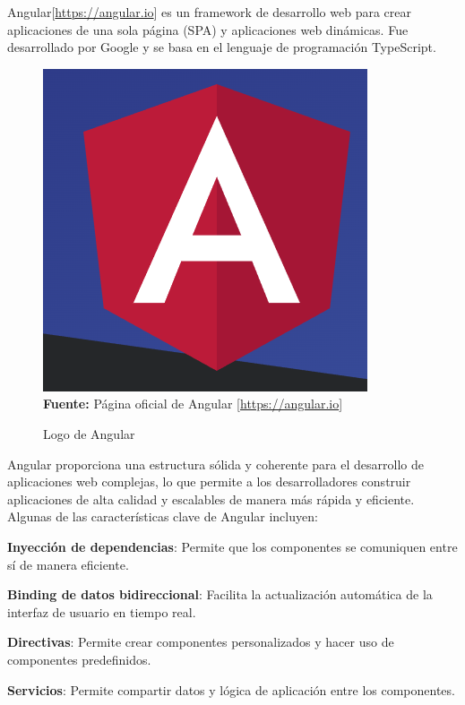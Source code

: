 Angular[\url{https://angular.io}] es un framework de desarrollo web para crear
aplicaciones de una sola página (SPA) y aplicaciones web dinámicas. Fue
desarrollado por Google y se basa en el lenguaje de programación TypeScript.
\begin{figure}[htb!]
    \centering
    \caption{Logo de Angular}
    \label{fig:angular-logo}
    \centering
    \includegraphics[scale=0.35]{./Ilustraciones/logos/Angular Logo.png}\\
    \textbf{Fuente:} Página oficial de Angular [\url{https://angular.io}]
\end{figure}
\hfill \break
Angular proporciona una estructura sólida y coherente para el desarrollo de
aplicaciones web complejas, lo que permite a los desarrolladores construir
aplicaciones de alta calidad y escalables de manera más rápida y eficiente.
Algunas de las características clave de Angular incluyen:

\textbf{Inyección de dependencias}: Permite que los componentes se comuniquen entre sí
de manera eficiente.

\textbf{Binding de datos bidireccional}: Facilita la actualización automática de la
interfaz de usuario en tiempo real.

\textbf{Directivas}: Permite crear componentes personalizados y hacer uso de componentes
predefinidos.

\textbf{Servicios}: Permite compartir datos y lógica de aplicación entre los
componentes.

